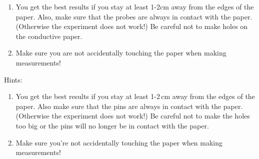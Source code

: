 \begin{minipage}[h]{0.55\textwidth}
    \begin{enumerate}
        \item You get the best results if you stay at least 1-2cm away from the edges of the paper. Also, make sure that the probes are always in contact with the paper. (Otherwise the experiment does not work!) Be careful not to make holes on the conductive paper.
        \item Make sure you are not accidentally touching the paper when making measurements!
    \end{enumerate}
\end{minipage}
\begin{minipage}[h]{0.45\textwidth}
    \begin{flushright}
        \vspace{0.5cm}
        \vspace{0.3cm}

        \vspace{0.3cm}

    \end{flushright}
\end{minipage}

\myskip
\noindent Hints:
\begin{enumerate}
    \item You get the best results if you stay at least 1-2$\,\mathrm{cm}$ away from the edges of the paper. Also make sure that the pins are always in contact with the paper. (Otherwise the experiment does not work!) Be careful not to make the holes too big or the pins will no longer be in contact with the paper.
    \item Make sure you're not accidentally touching the paper when making measurements!
\end{enumerate}

